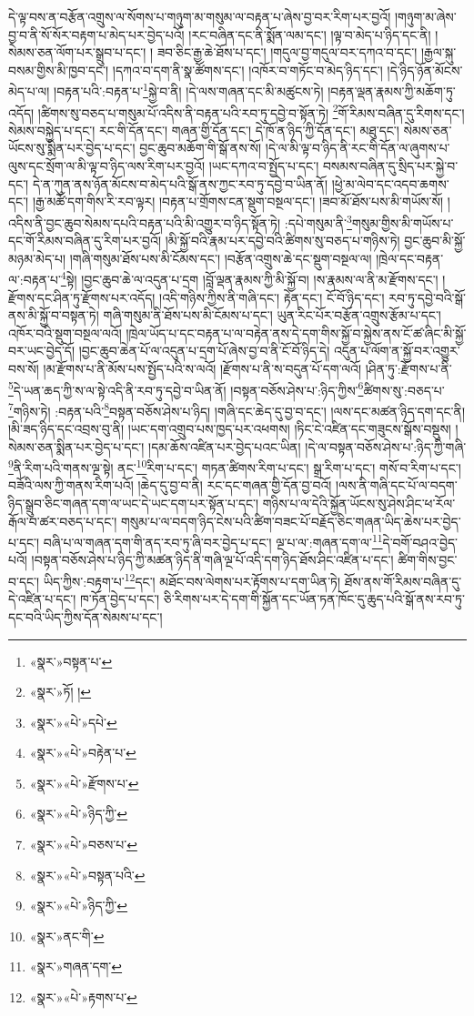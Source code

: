 དེ་ལྟ་བས་ན་བརྩོན་འགྲུས་ལ་སོགས་པ་གཉུག་མ་གསུམ་ལ་བརྟན་པ་ཞེས་བྱ་བར་རིག་པར་བྱའོ། །གཉུག་མ་ཞེས་བྱ་བ་ནི་སོ་སོར་བརྟག་པ་མེད་པར་བྱེད་པའོ། །རང་བཞིན་དང་ནི་སྨོན་ལམ་དང་། །ལྟ་བ་མེད་པ་ཉིད་དང་ནི། །སེམས་ཅན་ལོག་པར་སྒྲུབ་པ་དང་། །
ཟབ་ཅིང་རྒྱ་ཆེ་ཐོས་པ་དང་། །གདུལ་བྱ་གདུལ་བར་དཀའ་བ་དང་། །རྒྱལ་སྐུ་བསམ་གྱིས་མི་ཁྱབ་དང་། །དཀའ་བ་དག་ནི་སྣ་ཚོགས་དང་། །འཁོར་བ་གཏོང་བ་མེད་ཉིད་དང་། །དེ་ཉིད་ཉོན་མོངས་མེད་པ་ལ། །བརྟན་པའི་:བརྟན་པ་\footnote{«སྣར་»བསྟན་པ་}སྐྱེ་བ་ནི། །དེ་ལས་གཞན་དང་མི་མཚུངས་ཏེ། །བརྟན་ལྡན་རྣམས་ཀྱི་མཆོག་ཏུ་འདོད། །ཚིགས་སུ་བཅད་པ་གསུམ་པོ་འདིས་ནི་བརྟན་པའི་རབ་ཏུ་དབྱེ་བ་སྟོན་ཏེ། \footnote{«སྣར་»ཏོ། ། }གོ་རིམས་བཞིན་དུ་རིགས་དང་། སེམས་བསྐྱེད་པ་དང་། རང་གི་དོན་དང་། གཞན་གྱི་དོན་དང་། དེ་ཁོ་ན་ཉིད་ཀྱི་དོན་དང་། མཐུ་དང་། སེམས་ཅན་ཡོངས་སུ་སྨིན་པར་བྱེད་པ་དང་། བྱང་ཆུབ་མཆོག་གི་སྒོ་ནས་སོ། །དེ་ལ་མི་ལྟ་བ་ཉིད་ནི་རང་གི་དོན་ལ་ཞུགས་པ་ལུས་དང་སྲོག་ལ་མི་ལྟ་བ་ཉིད་ལས་རིག་པར་བྱའོ། །ཡང་དཀའ་བ་སྤྱོད་པ་དང་། བསམས་བཞིན་དུ་སྲིད་པར་སྐྱེ་བ་དང་། དེ་ན་ཀུན་ནས་ཉོན་མོངས་བ་མེད་པའི་སྒོ་ནས་ཀྱང་རབ་ཏུ་དབྱེ་བ་ཡིན་ནོ། །ཕྱེ་མ་ལེབ་དང་འདབ་ཆགས་དང་། །རྒྱ་མཚོ་དག་གིས་རི་རབ་ལྟར། །བརྟན་པ་གྲོགས་ངན་སྡུག་བསྔལ་དང་། །ཟབ་མོ་ཐོས་པས་མི་གཡོས་སོ། །འདིས་ནི་བྱང་ཆུབ་སེམས་དཔའི་བརྟན་པའི་མི་འགྱུར་བ་ཉིད་སྟོན་ཏེ། :དཔེ་གསུམ་ནི་\footnote{«སྣར་»«པེ་»དཔེ་}གསུམ་གྱིས་མི་གཡོས་པ་དང་གོ་རིམས་བཞིན་དུ་རིག་པར་བྱའོ། །མི་སྐྱོ་བའི་རྣམ་པར་དབྱེ་བའི་ཚིགས་སུ་བཅད་པ་གཉིས་ཏེ། བྱང་ཆུབ་མི་སྐྱོ་མཉམ་མེད་པ། །གཞི་གསུམ་ཐོས་པས་མི་ངོམས་དང་། །བརྩོན་འགྲུས་ཆེ་དང་སྡུག་བསྔལ་ལ། །ཁྲེལ་དང་བརྟན་ལ་:བརྟན་པ་\footnote{«སྣར་»«པེ་»བརྟེན་པ་}སྟེ། །བྱང་ཆུབ་ཆེ་ལ་འདུན་པ་དྲག །བློ་ལྡན་རྣམས་ཀྱི་མི་སྐྱོ་བ། །ས་རྣམས་ལ་ནི་མ་རྫོགས་དང་། །རྫོགས་དང་ཤིན་ཏུ་རྫོགས་པར་འདོད། །འདི་གཉིས་ཀྱིས་ནི་གཞི་དང་། རྟེན་དང་། ངོ་བོ་ཉིད་དང་། རབ་ཏུ་དབྱེ་བའི་སྒོ་ནས་མི་སྐྱོ་བ་བསྟན་ཏེ། གཞི་གསུམ་ནི་ཐོས་པས་མི་ངོམས་པ་དང་། ཡུན་རིང་པོར་བརྩོན་འགྲུས་རྩོམ་པ་དང་། འཁོར་བའི་སྡུག་བསྔལ་ལའོ། །ཁྲེལ་ཡོད་པ་དང་བརྟན་པ་ལ་བརྟེན་ནས་དེ་དག་གིས་སྐྱོ་བ་སྐྱེས་ནས་ངོ་ཚ་ཞིང་མི་སྐྱོ་བར་ཡང་བྱེད་དོ། །བྱང་ཆུབ་ཆེན་པོ་ལ་འདུན་པ་དྲག་པོ་ཞེས་བྱ་བ་ནི་ངོ་བོ་ཉིད་དེ། འདུན་པ་ལོག་ན་སྐྱོ་བར་འགྱུར་བས་སོ། །མ་རྫོགས་པ་ནི་མོས་པས་སྤྱོད་པའི་ས་ལའོ། །རྫོགས་པ་ནི་ས་བདུན་པོ་དག་ལའོ། །ཤིན་ཏུ་:རྫོགས་པ་ནི་\footnote{«སྣར་»«པེ་»རྫོགས་པ་}དེ་ཡན་ཆད་ཀྱི་ས་ལ་སྟེ་འདི་ནི་རབ་ཏུ་དབྱེ་བ་ཡིན་ནོ། །བསྟན་བཅོས་ཤེས་པ་:ཉིད་ཀྱིས་\footnote{«སྣར་»«པེ་»ཉིད་ཀྱི་}ཚིགས་སུ་:བཅད་པ་\footnote{«སྣར་»«པེ་»བཅས་པ་}གཉིས་ཏེ། :བརྟན་པའི་\footnote{«སྣར་»«པེ་»བསྟན་པའི་}བསྟན་བཅོས་ཤེས་པ་ཉིད། །གཞི་དང་ཆེད་དུ་བྱ་བ་དང་། །ལས་དང་མཚན་ཉིད་དག་དང་ནི། །མི་ཟད་ཉིད་དང་འབྲས་བུ་ནི། །ཡང་དག་འགྲུབ་པས་ཁྱད་པར་འཕགས། །ཏིང་ངེ་འཛིན་དང་གཟུངས་སྒོས་བསྡུས། །སེམས་ཅན་སྨིན་པར་བྱེད་པ་དང་། །དམ་ཆོས་འཛིན་པར་བྱེད་པའང་ཡིན། །དེ་ལ་བསྟན་བཅོས་ཤེས་པ་:ཉིད་ཀྱི་གཞི་\footnote{«སྣར་»«པེ་»ཉིད་ཀྱི་}ནི་རིག་པའི་གནས་ལྔ་སྟེ། ནང་\footnote{«སྣར་»ནང་གི་}རིག་པ་དང་། གཏན་ཚིགས་རིག་པ་དང་། སྒྲ་རིག་པ་དང་། གསོ་བ་རིག་པ་དང་། བཟོའི་ལས་ཀྱི་གནས་རིག་པའོ། །ཆེད་དུ་བྱ་བ་ནི། རང་དང་གཞན་གྱི་དོན་བྱ་བའོ། །ལས་ནི་གཞི་དང་པོ་ལ་བདག་ཉིད་སྒྲུབ་ཅིང་གཞན་དག་ལ་ཡང་དེ་ཡང་དག་པར་སྟོན་པ་དང་། གཉིས་པ་ལ་དེའི་སྐྱོན་ཡོངས་སུ་ཤེས་ཤིང་ཕ་རོལ་རྒོལ་བ་ཚར་བཅད་པ་དང་། གསུམ་པ་ལ་བདག་ཉིད་ངེས་པའི་ཚིག་བཟང་པོ་བརྗོད་ཅིང་གཞན་ཡིད་ཆེས་པར་བྱེད་པ་དང་། བཞི་པ་ལ་གཞན་དག་གི་ནད་རབ་ཏུ་ཞི་བར་བྱེད་པ་དང་། ལྔ་པ་ལ་:གཞན་དག་ལ་\footnote{«སྣར་»གཞན་དག་}དེ་བགོ་བཤའ་བྱེད་པའོ། །བསྟན་བཅོས་ཤེས་པ་ཉིད་ཀྱི་མཚན་ཉིད་ནི་གཞི་ལྔ་པོ་འདི་དག་ཉིད་ཐོས་ཤིང་འཛིན་པ་དང་། ཚིག་གིས་བྱང་བ་དང་། ཡིད་ཀྱིས་:བརྟག་པ་\footnote{«སྣར་»«པེ་»རྟགས་པ་}དང་། མཐོང་བས་ལེགས་པར་རྟོགས་པ་དག་ཡིན་ཏེ། ཐོས་ནས་གོ་རིམས་བཞིན་དུ་དེ་འཛིན་པ་དང་། ཁ་ཏོན་བྱེད་པ་དང་། ཅི་རིགས་པར་དེ་དག་གི་སྐྱོན་དང་ཡོན་ཏན་ཁོང་དུ་ཆུད་པའི་སྒོ་ནས་རབ་ཏུ་དང་བའི་ཡིད་ཀྱིས་དོན་སེམས་པ་དང་། 